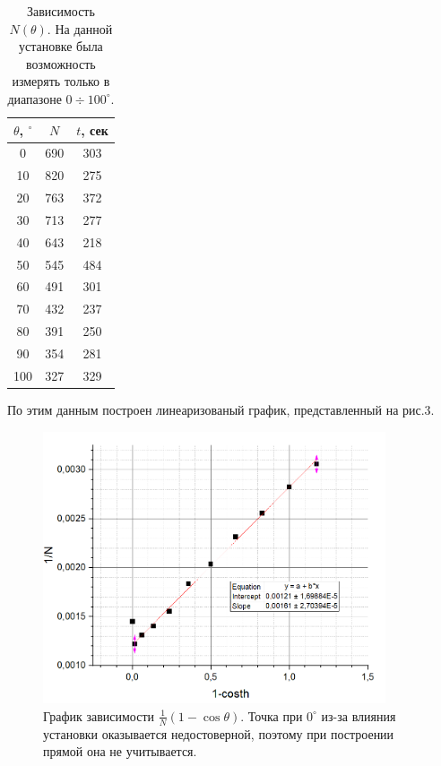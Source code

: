 \documentclass[a4paper, 14pt]{extarticle}%
\newcommand\ECaption[1]{%
     \captionsetup{font=footnotesize}%
     \caption{#1}}
\begin{document}
\begin{table}[h!]
\begin{center}
\begin{tabular}{|c|c|c|}
\hline
\rowcolor[HTML]{9698ED} 
$\theta$, $^{\circ}$ & $N$ & $t$, сек \\ \hline
0                    & 690 & 303      \\ \hline
\rowcolor[HTML]{9698ED} 
10                   & 820 & 275      \\ \hline
20                   & 763 & 372      \\ \hline
\rowcolor[HTML]{9698ED} 
30                   & 713 & 277      \\ \hline
40                   & 643 & 218      \\ \hline
\rowcolor[HTML]{9698ED} 
50                   & 545 & 484      \\ \hline
60                   & 491 & 301      \\ \hline
\rowcolor[HTML]{9698ED} 
70                   & 432 & 237      \\ \hline
80                   & 391 & 250      \\ \hline
\rowcolor[HTML]{9698ED} 
90                   & 354 & 281      \\ \hline
100                  & 327 & 329      \\ \hline
\end{tabular}
\ECaption{Зависимость $N(\theta)$. На данной установке была возможность измерять только в диапазоне $0\div100^{\circ}$. }
\end{center}
\end{table}

По этим данным построен линеаризованый график, представленный на рис.3.
\begin{figure}[h]
\begin{center}
\includegraphics[width=0.9\textwidth]{gr1}
\end{center}
\ECaption{График зависимости $\frac{1}{N}(1-\cos\theta)$. Точка при $0^{\circ}$ из-за влияния установки оказывается недостоверной, поэтому при построении прямой она не учитывается.}
\end{figure}
\end{document}
